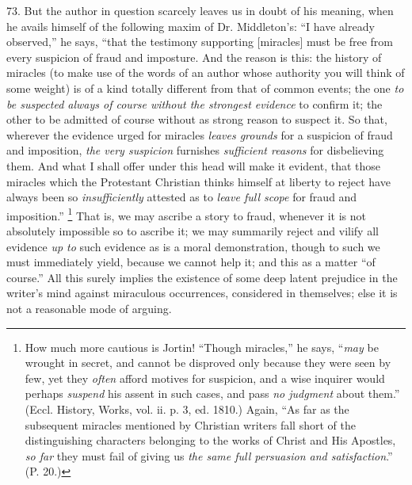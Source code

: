 73.
But the author in question scarcely leaves us in doubt of his meaning,
when he avails himself of the following maxim of Dr. Middleton's: ``I
have already observed,'' he says, ``that the testimony supporting
[miracles] must be free from every suspicion of fraud and imposture.
And the reason is this: the history of miracles (to make use of the
words of an author whose authority you will think of some weight) is
of a kind totally different from that of common events; the one \emph{to
be suspected always of course without the strongest evidence} to
confirm it; the other to be admitted of course without as strong
reason to suspect it. So that, wherever the evidence urged for
miracles \emph{leaves grounds} for a suspicion of fraud and
imposition, \emph{the very suspicion} furnishes \emph{sufficient
reasons} for disbelieving them. And what I shall offer under this
head will make it evident, that those miracles which the Protestant
Christian thinks himself at liberty to reject have always been so \emph{insufficiently}
attested as to \emph{leave full scope} for fraud and imposition.'' \footnote{How much more cautious is Jortin! ``Though miracles,'' he says, ``\emph{may}
be wrought in secret, and cannot be disproved only because they were
seen by few, yet they \emph{often} afford motives for suspicion, and a
wise inquirer would perhaps \emph{suspend} his assent in such cases,
and pass \emph{no judgment} about them.'' (Eccl. History, Works, vol.
ii. p. 3, ed. 1810.) Again, ``As far as the subsequent miracles
mentioned by Christian writers fall short of the distinguishing
characters belonging to the works of Christ and His Apostles, \emph{so
far} they must fail of giving us \emph{the same full persuasion and
satisfaction}.'' (P. 20.)} That is, we may ascribe a story to fraud, whenever it is not
absolutely impossible so to ascribe it; we may summarily reject and
vilify all evidence \emph{up to} such evidence as is a moral
demonstration, though to such we must immediately yield, because we
cannot help it; and this as a matter ``of course.'' All this surely
implies the existence of some deep latent prejudice in the writer's
mind against miraculous occurrences, considered in themselves; else it
is not a reasonable mode of arguing.

